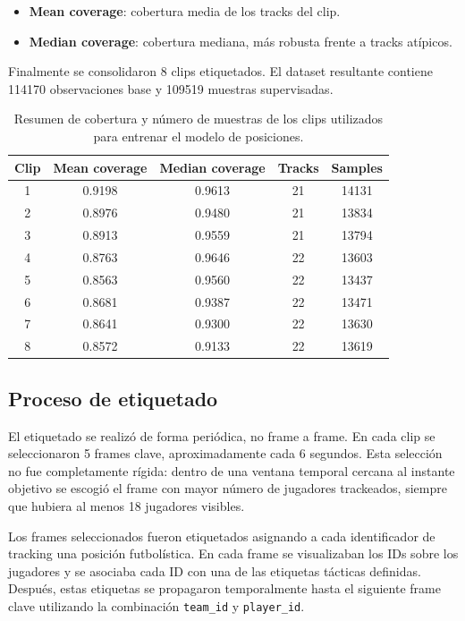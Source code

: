 \begin{itemize}
    \item \textbf{Mean coverage}: cobertura media de los tracks del clip.
    \item \textbf{Median coverage}: cobertura mediana, más robusta frente a tracks atípicos.
\end{itemize}

Finalmente se consolidaron 8 clips etiquetados. El dataset resultante contiene 114170 observaciones base y 109519 muestras supervisadas.

\begin{table}[H]
\centering
\scriptsize
\begin{tabular}{c|c|c|c|c}
\textbf{Clip} & \textbf{Mean coverage} & \textbf{Median coverage} & \textbf{Tracks} & \textbf{Samples} \\
\hline\hline
1 & 0.9198 & 0.9613 & 21 & 14131 \\
\hline
2 & 0.8976 & 0.9480 & 21 & 13834 \\
\hline
3 & 0.8913 & 0.9559 & 21 & 13794 \\
\hline
4 & 0.8763 & 0.9646 & 22 & 13603 \\
\hline
5 & 0.8563 & 0.9560 & 22 & 13437 \\
\hline
6 & 0.8681 & 0.9387 & 22 & 13471 \\
\hline
7 & 0.8641 & 0.9300 & 22 & 13630 \\
\hline
8 & 0.8572 & 0.9133 & 22 & 13619 \\
\hline
\end{tabular}
\caption{Resumen de cobertura y número de muestras de los clips utilizados para entrenar el modelo de posiciones.}
\label{tab:position_dataset_clips}
\end{table}

\subsection{Proceso de etiquetado}

El etiquetado se realizó de forma periódica, no frame a frame. En cada clip se seleccionaron 5 frames clave, aproximadamente cada 6 segundos. Esta selección no fue completamente rígida: dentro de una ventana temporal cercana al instante objetivo se escogió el frame con mayor número de jugadores trackeados, siempre que hubiera al menos 18 jugadores visibles.

Los frames seleccionados fueron etiquetados asignando a cada identificador de tracking una posición futbolística. En cada frame se visualizaban los IDs sobre los jugadores y se asociaba cada ID con una de las etiquetas tácticas definidas. Después, estas etiquetas se propagaron temporalmente hasta el siguiente frame clave utilizando la combinación \texttt{team\_id} y \texttt{player\_id}.

